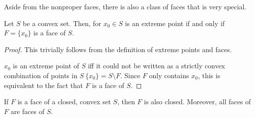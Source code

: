 Aside from the nonproper faces, there is also a class of faces that is very
special.

\begin{theorem}
\label{thr:Every extreme point forms a face}
  Let \( S \) be a convex set. Then, for \( x_{0} \in S \) is an extreme point
  if and only if \( F = \{x_{0}\}   \) is a face of \( S \).
\end{theorem}

\begin{proof}
  This trivially follows from the definition of extreme points and faces.

  \( x_{0} \) is an extreme point of \( S \) iff it could not be written as a
  strictly convex combination of points in \( S \ \{ x_{0} \} = S \setminus F
  \). Since \( F \) only contains \( x_{0} \), this is equivalent to the fact
  that \( F \) is a face of \( S \).
\end{proof}


\begin{theorem}
  If \( F \) is a face of a closed, convex set \( S \), then \( F \) is also
  closed. Moreover, all faces of \( F \) are faces of \( S \).
\end{theorem}


